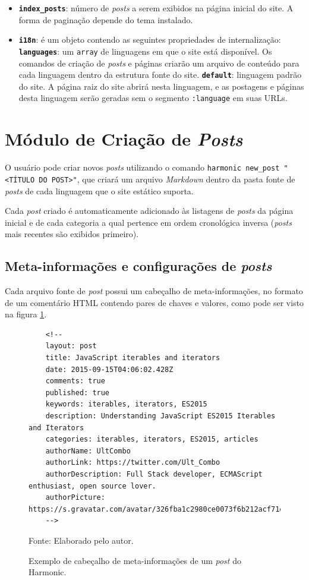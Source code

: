 \documentclass[ppginf, pep]{esinucpel}
\newcommand{\code}[1]{\texttt{#1}}
\begin{document}
\begin{itemize}
    \item \textbf{\code{index\_posts}}: número de \textit{posts} a serem exibidos na página inicial do site. A forma de paginação depende do tema instalado.
    \item \textbf{\code{i18n}}: é um objeto contendo as seguintes propriedades de internalização:
        \subitem \textbf{\code{languages}}: um \code{array} de linguagens em que o site está disponível. Os comandos de criação de \textit{posts} e páginas criarão um arquivo de conteúdo para cada linguagem dentro da estrutura fonte do site.
        \subitem \textbf{\code{default}}: linguagem padrão do site. A página raiz do site abrirá nesta linguagem, e as postagens e páginas desta linguagem serão geradas sem o segmento \code{:language} em suas URLs.
\end{itemize}

\section{Módulo de Criação de \textit{Posts}}

O usuário pode criar novos \textit{posts} utilizando o comando \code{harmonic new\_post "\textless TÍTULO DO POST\textgreater"}, que criará um arquivo \emph{Markdown} dentro da pasta fonte de \textit{posts} de cada linguagem que o site estático suporta.

Cada \textit{post} criado é automaticamente adicionado às listagens de \textit{posts} da página inicial e de cada categoria a qual pertence em ordem cronológica inversa (\textit{posts} mais recentes são exibidos primeiro).

\subsection{Meta-informações e configurações de \textit{posts}}

Cada arquivo fonte de \textit{post} possui um cabeçalho de meta-informações, no formato de um comentário HTML contendo pares de chaves e valores, como pode ser visto na figura \ref{fig:post_header}.

\begin{figure}[htbp]
    \centering
    \caption{Exemplo de cabeçalho de meta-informações de um \textit{post} do Harmonic.}
    
    \lstset{language=HTML}
    \begin{lstlisting}
    <!--
    layout: post
    title: JavaScript iterables and iterators
    date: 2015-09-15T04:06:02.428Z
    comments: true
    published: true
    keywords: iterables, iterators, ES2015
    description: Understanding JavaScript ES2015 Iterables and Iterators
    categories: iterables, iterators, ES2015, articles
    authorName: UltCombo
    authorLink: https://twitter.com/Ult_Combo
    authorDescription: Full Stack developer, ECMAScript enthusiast, open source lover.
    authorPicture: https://s.gravatar.com/avatar/326fba1c2980ce0073f6b212acf71ea0
    -->
    \end{lstlisting}
    
    Fonte: Elaborado pelo autor.
    \label{fig:post_header}
\end{figure}
\end{document}
